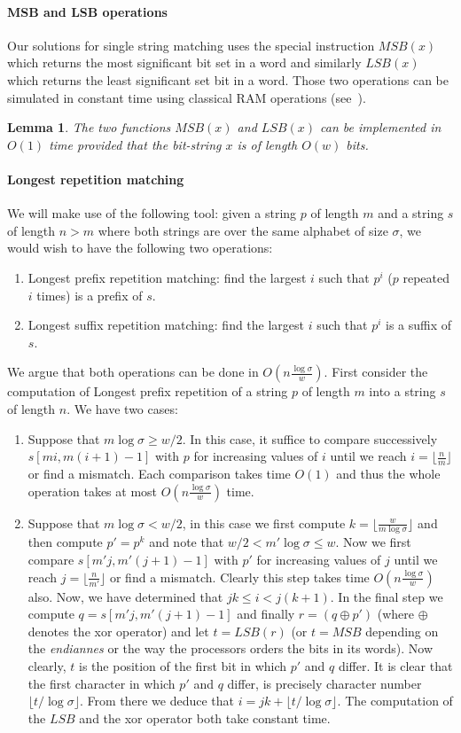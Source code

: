\documentclass{article}
\newcommand{\?}{\mskip1.5mu}
\newtheorem{lemma}{Lemma}
\begin{document}
\paragraph{MSB and LSB operations}
Our solutions for single string matching uses the special instruction $MSB(x)$ which returns the most significant bit set in a word and similarly $LSB(x)$ which returns the least significant set bit in a word. 
Those two operations can be simulated in constant time using classical RAM operations (see~\cite{AHNR98,FW93,Brodnik93}).
\begin{lemma}
The two functions $MSB(x)$ and $LSB(x)$ 
can be implemented in $O(1)$ time provided that the bit-string $x$ is of length $O(w)$ bits.
\end{lemma}

\paragraph{Longest repetition matching}
We will make use of the following tool: given a string $p$ of length $m$ and a string $s$ of length $n>m$ where both strings are over the same alphabet of size $\sigma$, we would wish to have the following two operations: 
\begin{enumerate}
\item Longest prefix repetition matching: find the largest $i$ such that $p^i$ ($p$ repeated $i$ times) is a prefix of $s$.
\item Longest suffix repetition matching: find the largest $i$ such that $p^i$ is a suffix of $s$.
\end{enumerate}
We argue that both operations can be done in $O(n\frac{\log\sigma}{w})$. First consider the computation of Longest prefix repetition of a string $p$ of length $m$ into a string $s$ of length $n$. We have two cases:
\begin{enumerate}
\item Suppose that $m\log\sigma\geq w/2$. In this case, it suffice to compare successively $s[mi,m(i+1)-1]$ with $p$ for increasing values of $i$ until we reach $i=\lfloor\frac{n}{m}\rfloor$ or find a mismatch. Each comparison takes time $O(1)$ and thus the whole operation takes at most $O(n\frac{\log\sigma}{w})$ time. 
\item Suppose that $m\log\sigma<w/2$, in this case we first compute $k=\lfloor\frac{w}{m\log\sigma}\rfloor$ and then compute $p'=p^k$ and note that $w/2<m'\log\sigma\leq w$. Now we first compare $s[m'j,m'(j+1)-1]$ with $p'$ for increasing values of $j$ until we reach $j=\lfloor\frac{n}{m'}\rfloor$ or find a mismatch. Clearly this step takes time $O(n\frac{\log\sigma}{w})$ also. Now, we have determined that $jk\leq i<j(k+1)$. In the final step we compute $q=s[m'j,m'(j+1)-1]$ and finally $r=(q\oplus p')$ (where $\oplus$ denotes the xor operator) and let $t=LSB(r)$ (or $t=MSB$ depending on the \emph{endiannes} or the way the processors orders the bits in its words). Now clearly, $t$ is the position of the first bit in which $p'$ and $q$ differ. It is clear that the first character in which $p'$ and $q$ differ, is precisely character number $\lfloor t/\log\sigma\rfloor$. From there we deduce that $i=jk+\lfloor t/\log\sigma\rfloor$. The computation of the $LSB$ and the xor operator both take constant time. 
\end{enumerate}
\end{document}
